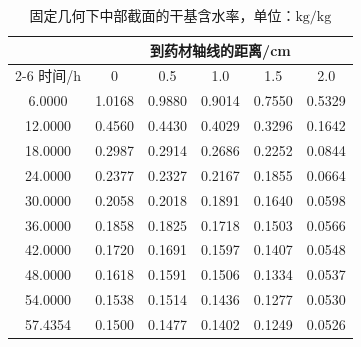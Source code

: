 \begin{table}[!htbp]\centering\small
\caption{固定几何下中部截面的干基含水率，单位：$\mathrm{kg/kg}$}\label{tab:q3-moisture}
\renewcommand{\arraystretch}{1.15}
\begin{tabular*}{0.96\textwidth}{@{\extracolsep{\fill}}cccccc}
\toprule
 & \multicolumn{5}{c}{到药材轴线的距离/cm}\\
\cmidrule(lr){2-6}
时间/h & 0 & 0.5 & 1.0 & 1.5 & 2.0\\\midrule
6.0000 & 1.0168 & 0.9880 & 0.9014 & 0.7550 & 0.5329\\
12.0000 & 0.4560 & 0.4430 & 0.4029 & 0.3296 & 0.1642\\
18.0000 & 0.2987 & 0.2914 & 0.2686 & 0.2252 & 0.0844\\
24.0000 & 0.2377 & 0.2327 & 0.2167 & 0.1855 & 0.0664\\
30.0000 & 0.2058 & 0.2018 & 0.1891 & 0.1640 & 0.0598\\
36.0000 & 0.1858 & 0.1825 & 0.1718 & 0.1503 & 0.0566\\
42.0000 & 0.1720 & 0.1691 & 0.1597 & 0.1407 & 0.0548\\
48.0000 & 0.1618 & 0.1591 & 0.1506 & 0.1334 & 0.0537\\
54.0000 & 0.1538 & 0.1514 & 0.1436 & 0.1277 & 0.0530\\
57.4354 & 0.1500 & 0.1477 & 0.1402 & 0.1249 & 0.0526\\
\bottomrule
\end{tabular*}
\par{}
\end{table}
